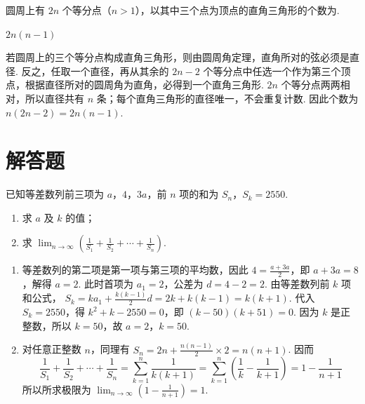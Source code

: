 \begin{problem}
圆周上有 \(2n\) 个等分点（\(n > 1\)），以其中三个点为顶点的直角三角形的个数为\fillinblank{}.
\end{problem}

\begin{answer}
\(2n(n-1)\)
\end{answer}

\begin{solution}
若圆周上的三个等分点构成直角三角形，则由圆周角定理，直角所对的弦必须是直径. 反之，任取一个直径，再从其余的 \(2n-2\) 个等分点中任选一个作为第三个顶点，根据直径所对的圆周角为直角，必得到一个直角三角形. \(2n\) 个等分点两两相对，所以直径共有 \(n\) 条；每个直角三角形的直径唯一，不会重复计数. 因此个数为 \(n(2n-2)=2n(n-1)\).
\end{solution}

\section{解答题}
\begin{problem}
已知等差数列前三项为 \(a\)，\(4\)，\(3a\)，前 \(n\) 项的和为 \(S_{n}\)，\(S_{k} = 2550\).

\begin{enumerate}
\item 求 \(a\) 及 \(k\) 的值；
\item 求 \(\displaystyle\lim_{n\to\infty}\left(\frac{1}{S_{1}}+\frac{1}{S_{2}}+\cdots+\frac{1}{S_{n}}\right)\).
\end{enumerate}
\end{problem}

\begin{solution}
\begin{enumerate}
\item 等差数列的第二项是第一项与第三项的平均数，因此 \(4=\frac{a+3a}{2}\)，即 \(a+3a=8\)，解得 \(a=2\). 此时首项为 \(a_1=2\)，公差为 \(d=4-2=2\). 由等差数列前 \(k\) 项和公式，
\(S_k=ka_1+\frac{k(k-1)}{2}d=2k+k(k-1)=k(k+1)\). 代入 \(S_k=2550\)，得 \(k^2+k-2550=0\)，即 \((k-50)(k+51)=0\). 因为 \(k\) 是正整数，所以 \(k=50\)，故 \(a=2\)，\(k=50\).
\item 对任意正整数 \(n\)，同理有 \(S_n=2n+\frac{n(n-1)}{2}\times2=n(n+1)\). 因而
\[
\frac{1}{S_1}+\frac{1}{S_2}+\cdots+\frac{1}{S_n}=\sum_{k=1}^{n}\frac{1}{k(k+1)}=\sum_{k=1}^{n}\left(\frac{1}{k}-\frac{1}{k+1}\right)=1-\frac{1}{n+1}
\]
所以所求极限为 \(\displaystyle\lim_{n\to\infty}\left(1-\frac{1}{n+1}\right)=1\).
\end{enumerate}
\end{solution}

